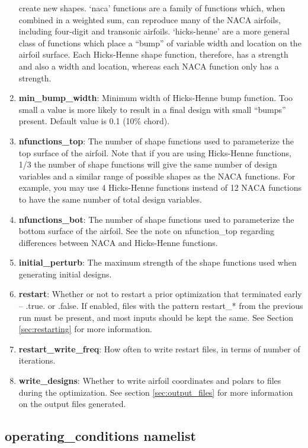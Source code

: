 \documentclass[11pt]{article}
\begin{document}
\begin{enumerate}
{create new shapes.  `naca' functions are a family of functions which, when combined in a
weighted sum, can reproduce many of the NACA airfoils, including four-digit and transonic
airfoils.  `hicks-henne' are a more general class of functions which place a ``bump'' of
variable width and location on the airfoil surface.  Each Hicks-Henne shape function,
therefore, has a strength and also a width and location, whereas each NACA function only
has a strength.}
\item{\textbf{min\_bump\_width}: Minimum width of Hicks-Henne bump function.  Too small a
value is more likely to result in a final design with small ``bumps'' present.  Default
value is 0.1 (10\% chord).}
\item{\textbf{nfunctions\_top}: The number of shape functions used to parameterize the top
surface of the airfoil.  Note that if you are using Hicks-Henne functions, 1/3 the
number of shape functions will give the same number of design variables and a similar range of
possible shapes as the NACA functions.  For example, you may use 4 Hicks-Henne functions
instead of 12 NACA functions to have the same number of total design variables.}
\item{\textbf{nfunctions\_bot}: The number of shape functions used to parameterize the
bottom surface of the airfoil.  See the note on nfunction\_top regarding differences
between NACA and Hicks-Henne functions.}
\item{\textbf{initial\_perturb}: The maximum strength of the shape functions used when
generating initial designs.}
\item{\textbf{restart}: Whether or not to restart a prior optimization that terminated
early -- .true. or .false.  If enabled, files with the pattern restart\_* from the 
previous run must be present, and most inputs should be kept the same. See Section 
\ref{sec:restarting} for more information.}
\item{\textbf{restart\_write\_freq}: How often to write restart files, in terms of number
of iterations.}
\item{\textbf{write\_designs}: Whether to write airfoil coordinates and polars to files
during the optimization.  See section \ref{sec:output_files} for more information on the
output files generated.}
\end{enumerate}

\subsection{operating\_conditions namelist}
\end{document}
